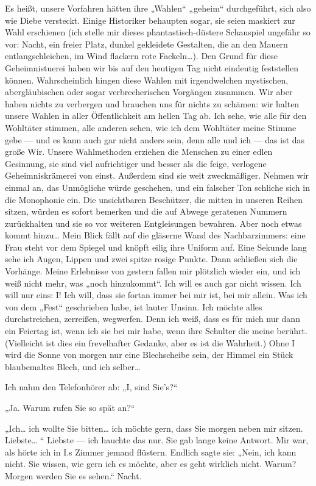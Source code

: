 Es heißt, unsere Vorfahren hätten ihre „Wahlen“ „geheim“
durchgeführt, sich also wie Diebe versteckt. Einige Historiker
behaupten sogar, sie seien maskiert zur Wahl erschienen (ich stelle
mir dieses phantastisch-düstere Schauspiel ungefähr so vor: Nacht,
ein freier Platz, dunkel gekleidete Gestalten, die an den Mauern
entlangschleichen, im Wind flackern rote Fackeln\ldots{}). Den Grund für
diese Geheimnistuerei haben wir bis auf den heutigen Tag nicht
eindeutig feststellen können. Wahrscheinlich hingen diese Wahlen
mit irgendwelchen mystischen, abergläubischen oder sogar
verbrecherischen Vorgängen zusammen. Wir aber haben nichts zu
verbergen und brauchen uns für nichts zu schämen: wir halten unsere
Wahlen in aller Öffentlichkeit am hellen Tag ab. Ich sehe, wie alle
für den Wohltäter stimmen, alle anderen sehen, wie ich dem
Wohltäter meine Stimme gebe — und es kann auch gar nicht anders
sein, denn alle und ich — das ist das große Wir. Unsere
Wahlmethoden erziehen die Menschen zu einer edlen Gesinnung, sie
sind viel aufrichtiger und besser als die feige, verlogene
Geheimniskrämerei von einst. Außerdem sind sie weit zweckmäßiger.
Nehmen wir einmal an, das Unmögliche würde geschehen, und ein
falscher Ton schliche sich in die Monophonie ein. Die unsichtbaren
Beschützer, die mitten in unseren Reihen sitzen, würden
es sofort bemerken und die auf Abwege geratenen Nummern
zurückhalten und sie so vor weiteren Entgleisungen bewahren. Aber
noch etwas kommt hinzu\ldots{} Mein Blick fällt auf die gläserne Wand
des Nachbarzimmers: eine Frau steht vor dem Spiegel und knöpft
eilig ihre Uniform auf. Eine Sekunde lang sehe ich Augen, Lippen
und zwei spitze rosige Punkte. Dann schließen sich die Vorhänge.
Meine Erlebnisse von gestern fallen mir plötzlich wieder ein, und
ich weiß nicht mehr, was „noch hinzukommt“. Ich will es auch gar
nicht wissen. Ich will nur eins: I! Ich will, dass sie fortan immer
bei mir ist, bei mir allein. Was ich von dem „Fest“ geschrieben
habe, ist lauter Unsinn. Ich möchte alles durchstreichen,
zerreißen, wegwerfen. Denn ich weiß, dass es für mich nur dann ein
Feiertag ist, wenn ich sie bei mir habe, wenn ihre Schulter die
meine berührt. (Vielleicht ist dies ein frevelhafter Gedanke, aber
es ist die Wahrheit.) Ohne I wird die Sonne von morgen nur eine
Blechscheibe sein, der Himmel ein Stück blaubemaltes Blech, und ich
selber\ldots{}

Ich nahm den Telefonhörer ab: „I, sind Sie's?“

„Ja. Warum rufen Sie so spät an?“

„Ich\ldots{} ich wollte Sie bitten\ldots{} ich möchte gern, dass Sie morgen
neben mir sitzen. Liebste\ldots{} “ Liebste — ich hauchte das nur. Sie
gab lange keine Antwort. Mir war, als hörte ich in I.s Zimmer
jemand flüstern. Endlich sagte sie: „Nein, ich kann nicht. Sie
wissen, wie gern ich es möchte, aber es geht wirklich nicht. Warum?
Morgen werden Sie es sehen.“ Nacht.

